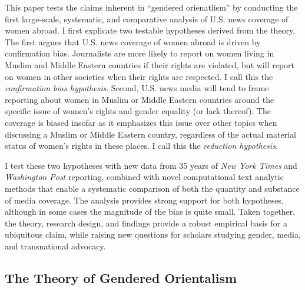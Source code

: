 \documentclass[11pt, oneside]{article}
\begin{document}
This paper tests the claims inherent in ``gendered orienatlism'' by conducting the first large-scale, systematic, and comparative analysis of U.S. news coverage of women abroad. I first explicate two testable hypotheses derived from the theory. The first argues that U.S. news coverage of women abroad is driven by confirmation bias. Journalists are more likely to report on women living in Muslim and Middle Eastern countries if their rights are violated, but will report on women in other societies when their rights are respected. I call this the \emph{confirmation bias hypothesis}. Second, U.S. news media will tend to frame reporting about women in Muslim or Middle Eastern countries around the specific issue of women's rights and gender equality (or lack thereof). The coverage is biased insofar as it emphasizes this issue over other topics when discussing a Muslim or Middle Eastern country, regardless of the actual material status of women's rights in these places. I call this the \emph{reduction hypothesis}.

I test these two hypotheses with new data from 35 years of \emph{New York Times} and \emph{Washington Post} reporting, combined with novel computational text analytic methods that enable a systematic comparison of both the quantity and substance of media coverage. The analysis provides strong support for both hypotheses, although in some cases the magnitude of the bias is quite small. Taken together, the theory, research design, and findings provide a robust empirical basis for a ubiquitous claim, while raising new questions for scholars studying gender, media, and transnational advocacy.   

\subsection{The Theory of Gendered Orientalism}
\end{document}
